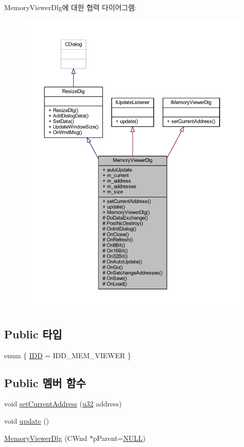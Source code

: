Memory\+Viewer\+Dlg에 대한 협력 다이어그램\+:\nopagebreak
\begin{figure}[H]
\begin{center}
\leavevmode
\includegraphics[width=350pt]{class_memory_viewer_dlg__coll__graph}
\end{center}
\end{figure}
\subsection*{Public 타입}
\begin{DoxyCompactItemize}
\item 
enum \{ \mbox{\hyperlink{class_memory_viewer_dlg_aca9567bd4cf2ec1aa5ac0473ce2d1fa2a7d71336246f22396669425fa2bea86cd}{I\+DD}} = I\+D\+D\+\_\+\+M\+E\+M\+\_\+\+V\+I\+E\+W\+ER
 \}
\end{DoxyCompactItemize}
\subsection*{Public 멤버 함수}
\begin{DoxyCompactItemize}
\item 
void \mbox{\hyperlink{class_memory_viewer_dlg_ac027e2a8dc226a7053068680050abd1f}{set\+Current\+Address}} (\mbox{\hyperlink{_system_8h_a10e94b422ef0c20dcdec20d31a1f5049}{u32}} address)
\item 
void \mbox{\hyperlink{class_memory_viewer_dlg_a0222a6beddfef071bc19b8849dc4ee15}{update}} ()
\item 
\mbox{\hyperlink{class_memory_viewer_dlg_aed16c2ef99beec1b0ffa2c9b22cd0e5c}{Memory\+Viewer\+Dlg}} (C\+Wnd $\ast$p\+Parent=\mbox{\hyperlink{_system_8h_a070d2ce7b6bb7e5c05602aa8c308d0c4}{N\+U\+LL}})
\end{DoxyCompactItemize}
